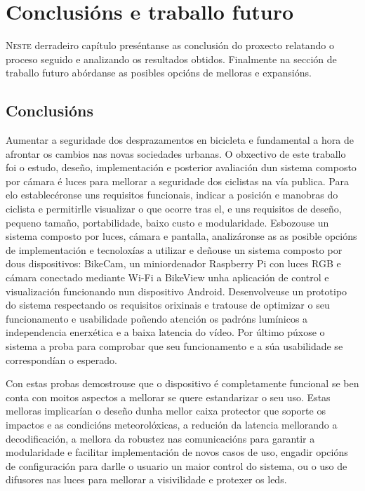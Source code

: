 \chapter{Conclusións e traballo futuro}
\label{chap:conclusions}
\lettrine{N}{este} derradeiro capítulo preséntanse as conclusión do proxecto relatando o proceso seguido e analizando os resultados obtidos. Finalmente na sección de traballo futuro abórdanse as posibles opcións de melloras e expansións.

\section{Conclusións}
Aumentar a seguridade dos desprazamentos en bicicleta e fundamental a hora de afrontar os cambios nas novas sociedades urbanas. O obxectivo de este traballo  foi o estudo, deseño, implementación e posterior avaliación dun sistema composto por cámara é luces para mellorar a seguridade dos ciclistas na vía publica. Para elo establecéronse uns requisitos funcionais, indicar a posición e manobras do ciclista e permitirlle visualizar o que ocorre tras el, e uns requisitos de deseño, pequeno tamaño, portabilidade, baixo custo e modularidade. Esbozouse un sistema composto por luces, cámara e pantalla, analizáronse as as posible opcións de implementación e tecnoloxías a utilizar e deñouse un sistema composto por dous dispositivos: BikeCam, un miniordenador Raspberry Pi con luces RGB e cámara conectado mediante Wi-Fi a BikeView unha aplicación de control e visualización funcionando nun dispositivo Android. Desenvolveuse un prototipo do sistema respectando os requisitos orixinais e tratouse de optimizar o seu funcionamento e usabilidade poñendo atención os padróns lumínicos a independencia enerxética e a baixa latencia do vídeo. Por último púxose o sistema a proba para comprobar que seu funcionamento e a súa usabilidade se correspondían o esperado.

Con estas probas demostrouse que o dispositivo é completamente funcional se ben conta con moitos aspectos a mellorar se quere estandarizar o seu uso. Estas melloras implicarían o deseño dunha mellor caixa protector que soporte os impactos e as condicións meteorolóxicas, a redución da latencia mellorando a decodificación, a mellora da robustez nas comunicacións para garantir a modularidade e facilitar implementación de novos casos de uso, engadir opcións de configuración para darlle o usuario un maior control do sistema, ou o uso de difusores nas luces para mellorar a visivilidade e protexer os leds.

